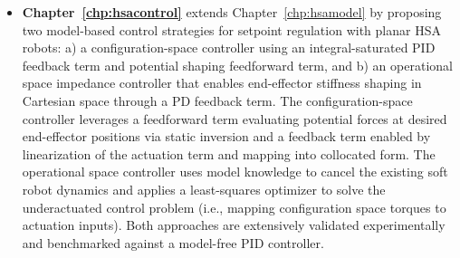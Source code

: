 \begin{itemize}
    \item \textbf{Chapter~\ref{chp:hsacontrol}} extends Chapter~\ref{chp:hsamodel} by proposing two model-based control strategies for setpoint regulation with planar \gls{HSA} robots: a) a configuration-space controller using an integral-saturated PID feedback term and potential shaping feedforward term, and b) an operational space impedance controller that enables end-effector stiffness shaping in Cartesian space through a PD feedback term. The configuration-space controller leverages a feedforward term evaluating potential forces at desired end-effector positions via static inversion and a feedback term enabled by linearization of the actuation term and mapping into collocated form. The operational space controller uses model knowledge to cancel the existing soft robot dynamics and applies a least-squares optimizer to solve the underactuated control problem (i.e., mapping configuration space torques to actuation inputs). Both approaches are extensively validated experimentally and benchmarked against a model-free PID controller.  

\end{itemize}
